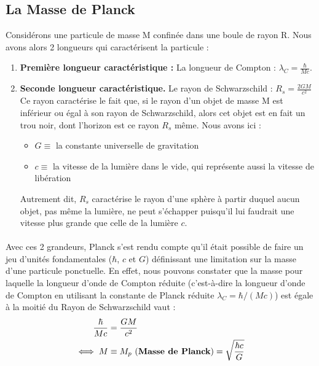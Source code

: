 \documentclass[../Notes de cours]{subfiles}
\begin{document}
\subsection{La Masse de Planck}
Considérons une particule de masse M confinée dans une boule de rayon R.
Nous avons alors 2 longueurs qui caractérisent la particule : 
\begin{enumerate}
\item \textbf{Première longueur caractéristique :} La longueur de Compton : $\lambda_C = \frac{\hbar}{Mc}$.
\item \textbf{Seconde longueur caractéristique.} Le rayon de Schwarzschild : $R_s = \frac{2GM}{c^2}$ \\ 
Ce rayon caractérise le fait que, si le rayon d'un objet de masse M est inférieur ou égal à son rayon de Schwarzschild, alors cet objet est en fait un trou noir, dont l'horizon est ce rayon $R_s$ même. 
Nous avons ici : 
	\begin{itemize}[label = \textbullet] 
		\item $G \equiv$ la constante universelle de gravitation 
		\item $c \equiv$ la vitesse de la lumière dans le vide, qui représente aussi la vitesse de libération 
	\end{itemize}
Autrement dit, $R_s$ caractérise le rayon d'une sphère à partir duquel aucun objet, pas même la lumière, ne peut s'échapper puisqu'il lui faudrait une vitesse plus grande que celle de la lumière $c$. 
\end{enumerate}

\paragraph{} Avec ces 2 grandeurs, Planck s'est rendu compte qu'il était possible de faire un jeu d'unités fondamentales ($\hbar$, $c$ et $G$) définissant une limitation sur la masse d'une particule ponctuelle. 
En effet, nous pouvons constater que la masse pour laquelle la longueur d'onde de Compton réduite (c'est-à-dire la longueur d'onde de Compton en utilisant la constante de Planck réduite $\lambda_C = \hbar/(Mc)$)
est égale à la moitié du Rayon de Schwarzschild  vaut : 
\begin{align}
\label{Masse de Planck}
\frac{\hbar}{Mc} &= \frac{GM}{c^2} \notag \\ 
\iff M & \equiv M_p \mbox{ (\textbf{Masse de Planck})} = \sqrt{\frac{\hbar c}{G}}
\end{align}
\end{document}
